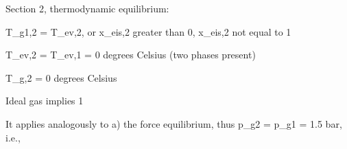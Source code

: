 Section 2, thermodynamic equilibrium:

T_g1,2 = T_ev,2, or x_eis,2 greater than 0, x_eis,2 not equal to 1

T_ev,2 = T_ev,1 = 0 degrees Celsius (two phases present)

T_g,2 = 0 degrees Celsius

Ideal gas implies 1

It applies analogously to a) the force equilibrium, thus p_g2 = p_g1 = 1.5 bar, i.e.,